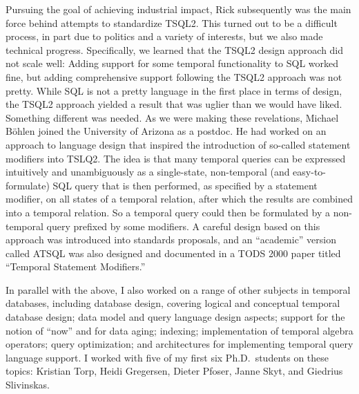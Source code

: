 \documentclass[11pt]{article}
\begin{document}
Pursuing the goal of achieving industrial impact, Rick subsequently was the main force behind attempts to standardize TSQL2. This turned out to be a difficult process, in part due to politics and a variety of interests, but we also made technical progress. Specifically, we learned that the TSQL2 design approach did not scale well: Adding support for some temporal functionality to SQL worked fine, but adding comprehensive support following the TSQL2 approach was not pretty. While SQL is not a pretty language in the first place in terms of design, the TSQL2 approach yielded a result that was uglier than we would have liked. Something different was needed. As we were making these revelations, Michael B\"{o}hlen joined the University of Arizona as a postdoc. He had worked on an approach to language design that inspired the introduction of so-called statement modifiers into TSLQ2. The idea is that many temporal queries can be expressed intuitively and unambiguously as a single-state, non-temporal (and easy-to-formulate) SQL query that is then performed, as specified by a statement modifier, on all states of a temporal relation, after which the results are combined into a temporal relation. So a temporal query could then be formulated by a non-temporal query prefixed by some modifiers. A careful design based on this approach was introduced into standards proposals, and an ``academic'' version called ATSQL was also designed and documented in a TODS 2000 paper titled ``Temporal Statement Modifiers.''

In parallel with the above, I also worked on a range of other subjects in temporal databases, including database design, covering logical and conceptual temporal database design; data model and query language design aspects; support for the notion of ``now'' and for data aging; indexing; implementation of temporal algebra operators; query optimization; and architectures for implementing temporal query language support. I worked with five of my first six Ph.D.\ students on these topics: Kristian Torp, Heidi Gregersen, Dieter Pfoser, Janne Skyt, and Giedrius Slivinskas.
\end{document}

